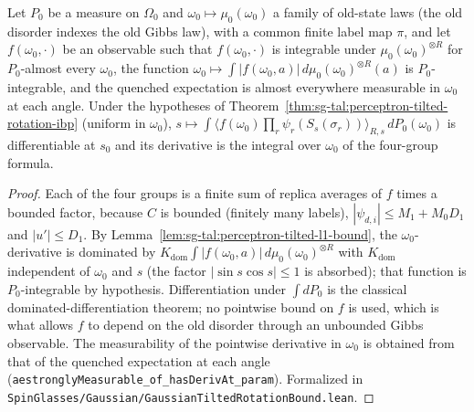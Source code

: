 \begin{theorem}\label{thm:sg-tal:perceptron-tilted-rotation-ibp-avg}
  \leanok
Let $P_0$ be a measure on $\Omega_0$ and $\omega_0\mapsto\mu_0(\omega_0)$ a family of old-state laws (the old disorder indexes the old Gibbs law), with a common finite label map $\pi$, and let $f(\omega_0,\cdot)$ be an observable such that
$f(\omega_0,\cdot)$ is integrable under $\mu_0(\omega_0)^{\otimes R}$ for $P_0$-almost every
$\omega_0$, the function $\omega_0\mapsto\int|f(\omega_0,a)|\,d\mu_0(\omega_0)^{\otimes R}(a)$
is $P_0$-integrable, and the quenched expectation is almost everywhere measurable in $\omega_0$
at each angle. Under the hypotheses of Theorem~\ref{thm:sg-tal:perceptron-tilted-rotation-ibp} (uniform in $\omega_0$),
$s\mapsto\int\langle f(\omega_0)\prod_r\psi_r(S_s(\sigma_r))\rangle_{R,s}\,dP_0(\omega_0)$ is differentiable at $s_0$ and its derivative is the integral over $\omega_0$ of the four-group formula.
\end{theorem}
\begin{proof}
  \leanok
Each of the four groups is a finite sum of replica averages of $f$ times a bounded factor, because $C$ is bounded (finitely many labels), $|\psi_{d,i}|\le M_1+M_0D_1$ and $|u'|\le D_1$. By Lemma~\ref{lem:sg-tal:perceptron-tilted-l1-bound}, the $\omega_0$-derivative is dominated by
$K_{\mathrm{dom}}\int|f(\omega_0,a)|\,d\mu_0(\omega_0)^{\otimes R}$ with $K_{\mathrm{dom}}$ independent of $\omega_0$ and $s$ (the factor $|\sin s\cos s|\le1$ is absorbed); that function is $P_0$-integrable by hypothesis. Differentiation under $\int dP_0$ is the classical dominated-differentiation theorem; no pointwise bound on $f$ is used, which is
what allows $f$ to depend on the old disorder through an unbounded Gibbs observable. The measurability of the pointwise derivative in $\omega_0$ is obtained from that of the quenched expectation at each angle (\texttt{aestronglyMeasurable\_of\_hasDerivAt\_param}).
Formalized in \texttt{SpinGlasses/Gaussian/GaussianTiltedRotationBound.lean}.
\end{proof}

